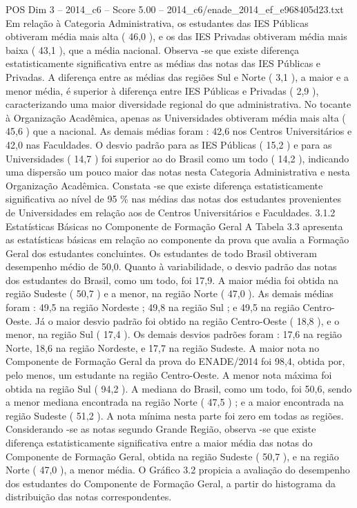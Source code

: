 \begin{textsample}{POS Dim 3 – 2014\_c6 – Score 5.00 – 2014\_c6/enade\_2014\_ef\_e968405d23.txt}
Em relação à Categoria Administrativa, os estudantes das IES Públicas obtiveram média mais alta ( 46,0 ), e os das IES Privadas obtiveram média mais baixa ( 43,1 ), que a média nacional.
Observa -se que existe diferença estatisticamente significativa entre as médias das notas das IES Públicas e Privadas.
A diferença entre as médias das regiões Sul e Norte ( 3,1 ), a maior e a menor média, é superior à diferença entre IES Públicas e Privadas ( 2,9 ), caracterizando uma maior diversidade regional do que administrativa.
No tocante à Organização Acadêmica, apenas as Universidades obtiveram média mais alta ( 45,6 ) que a nacional.
As demais médias foram : 42,6 nos Centros Universitários e 42,0 nas Faculdades.
O desvio padrão para as IES Públicas ( 15,2 ) e para as Universidades ( 14,7 ) foi superior ao do Brasil como um todo ( 14,2 ), indicando uma dispersão um pouco maior das notas nesta Categoria Administrativa e nesta Organização Acadêmica.
Constata -se que existe diferença estatisticamente significativa ao nível de 95 \% nas médias das notas dos estudantes provenientes de Universidades em relação aos de Centros Universitários e Faculdades. 3.1.2 Estatísticas Básicas no Componente de Formação Geral A Tabela 3.3 apresenta as estatísticas básicas em relação ao componente da prova que avalia a Formação Geral dos estudantes concluintes.
Os estudantes de todo Brasil obtiveram desempenho médio de 50,0.
Quanto à variabilidade, o desvio padrão das notas dos estudantes do Brasil, como um todo, foi 17,9.
A maior média foi obtida na região Sudeste ( 50,7 ) e a menor, na região Norte ( 47,0 ).
As demais médias foram : 49,5 na região Nordeste ; 49,8 na região Sul ; e 49,5 na região Centro-Oeste.
Já o maior desvio padrão foi obtido na região Centro-Oeste ( 18,8 ), e o menor, na região Sul ( 17,4 ).
Os demais desvios padrões foram : 17,6 na região Norte, 18,6 na região Nordeste, e 17,7 na região Sudeste.
A maior nota no Componente de Formação Geral da prova do ENADE/2014 foi 98,4, obtida por, pelo menos, um estudante na região Centro-Oeste.
A menor nota máxima foi obtida na região Sul ( 94,2 ).
A mediana do Brasil, como um todo, foi 50,6, sendo a menor mediana encontrada na região Norte ( 47,5 ) ; e a maior encontrada na região Sudeste ( 51,2 ).
A nota mínima nesta parte foi zero em todas as regiões.
Considerando -se as notas segundo Grande Região, observa -se que existe diferença estatisticamente significativa entre a maior média das notas do Componente de Formação Geral, obtida na região Sudeste ( 50,7 ), e na região Norte ( 47,0 ), a menor média.
O Gráfico 3.2 propicia a avaliação do desempenho dos estudantes do Componente de Formação Geral, a partir do histograma da distribuição das notas correspondentes.

\end{textsample}
